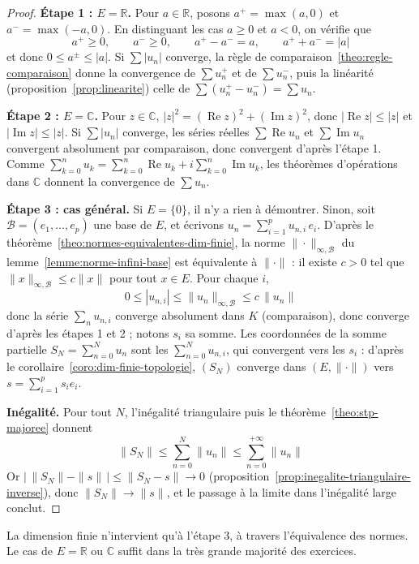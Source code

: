 \begin{proof}
\textbf{Étape 1 : $E=\mathbb{R}$.} Pour $a\in\mathbb{R}$, posons $a^+=\max(a,0)$ et $a^-=\max(-a,0)$. En distinguant les cas $a\geq 0$ et $a<0$, on vérifie que
\[a^+\geq 0,\qquad a^-\geq 0,\qquad a^+-a^-=a,\qquad a^++a^-=|a|\]
et donc $0\leq a^\pm\leq|a|$. Si $\sum|u_n|$ converge, la règle de comparaison~\ref{theo:regle-comparaison} donne la convergence de $\sum u_n^+$ et de $\sum u_n^-$, puis la linéarité (proposition~\ref{prop:linearite}) celle de $\sum(u_n^+-u_n^-)=\sum u_n$.

\textbf{Étape 2 : $E=\mathbb{C}$.} Pour $z\in\mathbb{C}$, $|z|^2=(\operatorname{Re}z)^2+(\operatorname{Im}z)^2$, donc $|\operatorname{Re}z|\leq|z|$ et $|\operatorname{Im}z|\leq|z|$. Si $\sum|u_n|$ converge, les séries réelles $\sum\operatorname{Re}u_n$ et $\sum\operatorname{Im}u_n$ convergent absolument par comparaison, donc convergent d'après l'étape 1. Comme $\sum_{k=0}^nu_k=\sum_{k=0}^n\operatorname{Re}u_k+i\sum_{k=0}^n\operatorname{Im}u_k$, les théorèmes d'opérations dans $\mathbb{C}$ donnent la convergence de $\sum u_n$.

\textbf{Étape 3 : cas général.} Si $E=\{0\}$, il n'y a rien à démontrer. Sinon, soit $\mathcal{B}=(e_1,\dots,e_p)$ une base de $E$, et écrivons $u_n=\sum_{i=1}^pu_{n,i}\,e_i$. D'après le théorème~\ref{theo:normes-equivalentes-dim-finie}, la norme $\|\cdot\|_{\infty,\mathcal{B}}$ du lemme~\ref{lemme:norme-infini-base} est équivalente à $\|\cdot\|$ : il existe $c>0$ tel que $\|x\|_{\infty,\mathcal{B}}\leq c\|x\|$ pour tout $x\in E$. Pour chaque $i$,
\[0\leq|u_{n,i}|\leq\|u_n\|_{\infty,\mathcal{B}}\leq c\,\|u_n\|\]
donc la série $\sum_n u_{n,i}$ converge absolument dans $K$ (comparaison), donc converge d'après les étapes 1 et 2 ; notons $s_i$ sa somme. Les coordonnées de la somme partielle $S_N=\sum_{n=0}^{N}u_n$ sont les $\sum_{n=0}^Nu_{n,i}$, qui convergent vers les $s_i$ : d'après le corollaire~\ref{coro:dim-finie-topologie}, $(S_N)$ converge dans $(E,\|\cdot\|)$ vers $s=\sum_{i=1}^ps_ie_i$.

\textbf{Inégalité.} Pour tout $N$, l'inégalité triangulaire puis le théorème~\ref{theo:stp-majoree} donnent
\[\|S_N\|\leq\sum_{n=0}^{N}\|u_n\|\leq\sum_{n=0}^{+\infty}\|u_n\|\]
Or $\big|\,\|S_N\|-\|s\|\,\big|\leq\|S_N-s\|\to 0$ (proposition~\ref{prop:inegalite-triangulaire-inverse}), donc $\|S_N\|\to\|s\|$, et le passage à la limite dans l'inégalité large conclut.
\end{proof}

\begin{remarque}
La dimension finie n'intervient qu'à l'étape 3, à travers l'équivalence des normes. Le cas de $E=\mathbb{R}$ ou $\mathbb{C}$ suffit dans la très grande majorité des exercices.
\end{remarque}

